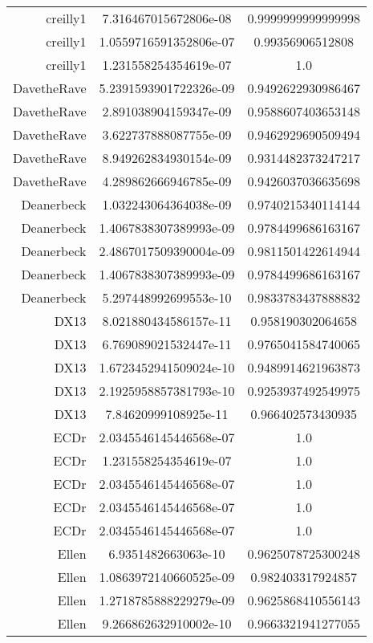 \begin{tabular}{r c c}
    creilly1 & 7.316467015672806e-08 & 0.9999999999999998 \\
    creilly1 & 1.0559716591352806e-07 & 0.99356906512808 \\
    creilly1 & 1.231558254354619e-07 & 1.0 \\
    DavetheRave & 5.2391593901722326e-09 & 0.9492622930986467 \\
    DavetheRave & 2.891038904159347e-09 & 0.9588607403653148 \\
    DavetheRave & 3.622737888087755e-09 & 0.9462929690509494 \\
    DavetheRave & 8.949262834930154e-09 & 0.9314482373247217 \\
    DavetheRave & 4.289862666946785e-09 & 0.9426037036635698 \\
    Deanerbeck & 1.032243064364038e-09 & 0.9740215340114144 \\
    Deanerbeck & 1.4067838307389993e-09 & 0.9784499686163167 \\
    Deanerbeck & 2.4867017509390004e-09 & 0.9811501422614944 \\
    Deanerbeck & 1.4067838307389993e-09 & 0.9784499686163167 \\
    Deanerbeck & 5.297448992699553e-10 & 0.9833783437888832 \\
    DX13 & 8.021880434586157e-11 & 0.958190302064658 \\
    DX13 & 6.769089021532447e-11 & 0.9765041584740065 \\
    DX13 & 1.6723452941509024e-10 & 0.9489914621963873 \\
    DX13 & 2.1925958857381793e-10 & 0.9253937492549975 \\
    DX13 & 7.84620999108925e-11 & 0.966402573430935 \\
    ECDr & 2.0345546145446568e-07 & 1.0 \\
    ECDr & 1.231558254354619e-07 & 1.0 \\
    ECDr & 2.0345546145446568e-07 & 1.0 \\
    ECDr & 2.0345546145446568e-07 & 1.0 \\
    ECDr & 2.0345546145446568e-07 & 1.0 \\
    Ellen & 6.9351482663063e-10 & 0.9625078725300248 \\
    Ellen & 1.0863972140660525e-09 & 0.982403317924857 \\
    Ellen & 1.2718785888229279e-09 & 0.9625868410556143 \\
    Ellen & 9.266862632910002e-10 & 0.9663321941277055 \\

\end{tabular}
